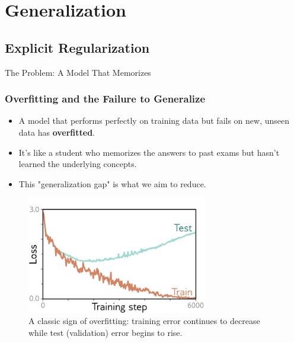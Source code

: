 \section{Generalization}

\subsection{Explicit Regularization}

\begin{frame}{The Problem: A Model That Memorizes}
    \frametitle{Overfitting and the Failure to Generalize}
    \begin{itemize}
        \item A model that performs perfectly on training data but fails on new, unseen data has \textbf{overfitted}.
        \item It's like a student who memorizes the answers to past exams but hasn't learned the underlying concepts.
        \item This "generalization gap" is what we aim to reduce.
    \end{itemize}
    \begin{figure}
        \includegraphics[width=0.7\textwidth]{images/generalization_gap.png}
        \caption{A classic sign of overfitting: training error continues to decrease while test (validation) error begins to rise.}
    \end{figure}
\end{frame}

